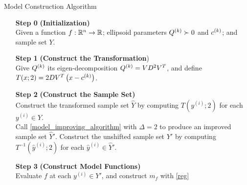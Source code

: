 \documentclass{article}
\begin{document}
{
\begin{fullwidth}[leftmargin=0in, rightmargin=0in, width=\linewidth-0.5in]
\begin{flushleft}

\begin{algorithm}[H]
    \caption{Model Construction Algorithm}
    \label{model_construction_algorithm}
    \begin{itemize}
        \item[\textbf{Step 0}] \textbf{(Initialization)} \\
			Given a function $f : \mathbb R^n \to \mathbb R$;
			ellipsoid parameters ${Q^{(k)}} \succ 0$ and $c^{(k)}$;
        	and sample set $Y$.
        \item[\textbf{Step 1}] \textbf{(Construct the Transformation}) \\
        	Give ${Q^{(k)}}$ its eigen-decomposition ${Q^{(k)}} = VD^2V^T$, and define
			$T(x; 2) = 2 D V^T\left(x - c^{(k)}\right)$.
        \item[\textbf{Step 2}] \textbf{(Construct the Sample Set)} \\
        Construct the transformed sample set $\hat Y$ by computing $T\left(y^{(i)}; 2\right)$ for each $y^{(i)} \in Y$. \\
        Call \cref{model_improving_algorithm} with $\Delta = 2$  to produce an improved sample set $\hat Y '$.
        Construct the unshifted sample set $Y'$ by computing $T^{-1}\left(\hat y^{(i)}; 2\right)$ for each $\hat y^{(i)} \in \hat Y'$.
        \item[\textbf{Step 3}] \textbf{(Construct Model Functions)} \\
        Evaluate $f$ at each $y^{(i)} \in Y'$, and construct $m_f$ with \cref{reg}
    \end{itemize}
\end{algorithm}


\end{flushleft}
\end{fullwidth}
}
\end{document}
